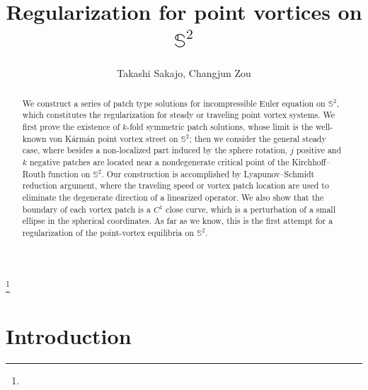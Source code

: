 \documentclass[12pt,reqno]{amsart}
\numberwithin{equation}{section}
\theoremstyle{definition}
\theoremstyle{remark}
\begin{document}
	
	
	
	
	
	\title
	[Regularization for point vortices on $\mathbb S^2$]{Regularization for point vortices on $\mathbb S^2$} 
	
	\author{Takashi Sakajo, Changjun Zou}
	
	\address{Department of Mathematics, Kyoto University, Kyoto, 606--8502, Japan}
	\address{Department of Mathematics, Sichuan University, Chengdu, Sichuan, 610064, P.R. China}
	
	\thanks{}
	
	
	\begin{abstract}
		We construct a series of patch type solutions for incompressible Euler equation on $\mathbb S^2$, which constitutes the regularization for steady or traveling point vortex systems. We first prove the existence of $k$-fold symmetric patch solutions, whose limit is the well-known von K\'arm\'an point vortex street on $\mathbb S^2$; then we consider the general steady case, where besides a non-localized part induced by the sphere rotation, $j$ positive and $k$ negative patches are located near a nondegenerate critical point of the Kirchhoff--Routh function %
on $\mathbb S^2$. Our construction is accomplished by Lyapunov--Schmidt reduction argument, where the traveling speed or vortex patch location are used to eliminate the degenerate direction of a linearized operator. %
We also show that the boundary of each vortex patch %
is a $C^1$ close curve, which is a perturbation of a small ellipse in the spherical coordinates. As far as we know, this is the first attempt for a regularization of the point-vortex equilibria on $\mathbb S^2$. 
	\end{abstract}
	
	
	\tableofcontents
	
	
	\section{Introduction}
	
\end{document}
